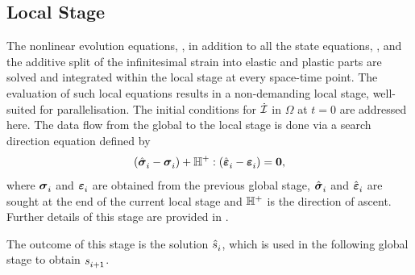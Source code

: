 \subsection{Local Stage}
\label{sec_local_stage}
The nonlinear evolution equations, , in addition to all the state equations, , and the additive split of the infinitesimal strain into elastic and plastic parts are solved and integrated within the local stage at every space-time point. The evaluation of such local equations results in a non-demanding local stage, well-suited for parallelisation. The initial conditions for $\dot{\cI}$ in $\Omega$ at $t=0$ are addressed here. The data flow from the global to the local stage is done via a search direction equation defined by
\begin{equation}
	(\stepj[]{\fsigma}-\stepi[]{\fsigma})
	+ {\ffH^+} \dcontraction (\stepj[]{\feps}-\stepi[]{\feps})
	= \fzero,
	\label{eq:local_search}
\end{equation}
where $\stepi[]{\fsigma}$ and $\stepi[]{\feps}$ are obtained from the previous global stage, $\stepj[]{\fsigma}$ and $\stepj[]{\feps}$ are sought at the end of the current local stage and ${\ffH^+}$ is the direction of ascent. Further details of this stage are provided in .

The outcome of this stage is the solution $\stepj{s}$, which is used in the following global stage to obtain $\stepk{s}$.

